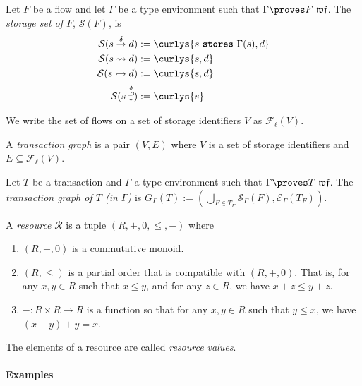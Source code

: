 \documentclass[10pt]{article}
\newcommand{\consumesarr}{\mathrel{\rotatebox[origin=c]{270}{${\looparrowright}$}}}
\newcommand{\consumes}[1]{\stackrel{#1}{\consumesarr}}
\newcommand{\sends}[1]{\stackrel{#1}{\to}}
\newcommand{\stores}{\textbf{\texttt{stores}}\xspace}
\newcommand{\merge}{\rightsquigarrow}
\newcommand{\heldby}{\rightarrowtail}
\begin{document}
\begin{definition}
    Let $F$ be a flow and let $\Gamma$ be a type environment such that $\Gamma \proves F~\mathfrak{wf}$.
    The \emph{storage set of $F$}, $\mathcal{S}(F)$, is
    \begin{align*}
        \mathcal{S}(s \sends{\delta} d) & := \curlys{s~\stores~\Gamma(s),d} \\
        \mathcal{S}(s \merge d) & := \curlys{s,d} \\
        \mathcal{S}(s \heldby d) & := \curlys{s,d} \\
        \mathcal{S}(s \consumes{\delta}) & := \curlys{s}
    \end{align*}
\end{definition}

We write the set of flows on a set of storage identifiers $V$ as $\mathcal{F}_\ell(V)$.

\begin{definition}
    A \emph{transaction graph} is a pair $(V, E)$ where $V$ is a set of storage identifiers and $E \subseteq \mathcal{F}_\ell(V)$.
\end{definition}

\begin{definition}
    Let $T$ be a transaction and $\Gamma$ a type environment such that $\Gamma \proves T~\mathfrak{wf}$.
    The \emph{transaction graph of $T$ (in $\Gamma$)} is $G_{\Gamma}(T) := (\bigcup_{F \in T_F} \mathcal{S}_{\Gamma}(F), \mathcal{E}_{\Gamma}(T_F))$.
\end{definition}

\begin{definition}
    A \emph{resource} $\mathcal{R}$ is a tuple $(R, +, 0, \leq, -)$ where
    \begin{enumerate}[label=(\roman*)]
        \item $(R, +, 0)$ is a commutative monoid.
        \item $(R, \leq)$ is a partial order that is compatible with $(R, +, 0)$.
            That is, for any $x, y \in R$ such that $x \leq y$, and for any $z \in R$, we have $x + z \leq y + z$.
        \item $- : R \times R \to R$ is a function so that for any $x,y \in R$ such that $y \leq x$, we have $(x - y) + y = x$.
    \end{enumerate}
    The elements of a resource are called \emph{resource values}.
\end{definition}

\paragraph{Examples}
\end{document}
